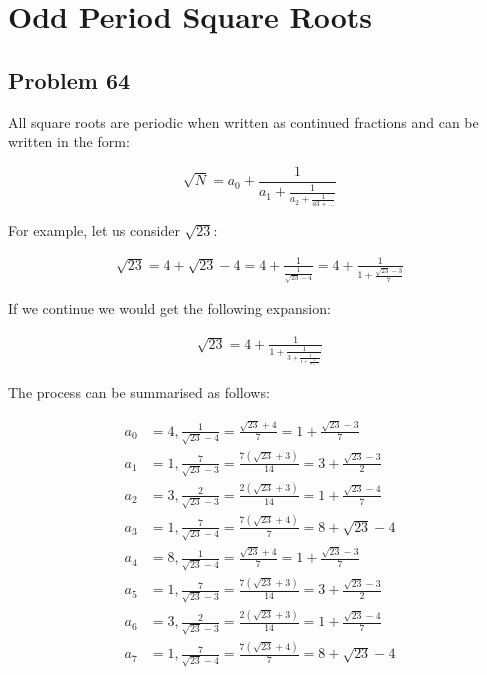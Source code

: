 \chapter{Odd Period Square Roots}
\section{Problem 64}

All square roots are periodic when written as continued fractions and can be written in the form:

\[
	\sqrt{N} = a_0 + \frac{1}{a_1 + \frac{1}{a_2 + \frac{1}{a3 + \dots}}}
\]


For example, let us consider $\sqrt{23}$:

\begin{align*}
	\sqrt{23} = 4 + \sqrt{23} - 4 = 4 + \frac{1}{\frac{1}{\sqrt{23}-4}} = 4 + \frac{1}{1 + \frac{\sqrt{23} - 3}{7}}
\end{align*}

If we continue we would get the following expansion:

\begin{align*}
	\sqrt{23} = 4 + \frac{1}{1 + \frac{1}{3 + \frac{1}{1 + \frac{1}{8 + \dots}}}}
\end{align*}

The process can be summarised as follows:

\begin{align*}
	a_0 & = 4, \frac{1}{\sqrt{23} - 4}  = \frac{\sqrt{23} + 4}{7}      = 1 + \frac{\sqrt{23} -3}{7} \\
	a_1 & = 1, \frac{7}{\sqrt{23} - 3}  = \frac{7(\sqrt{23} + 3)}{14}  = 3 + \frac{\sqrt{23} -3}{2} \\
	a_2 & = 3, \frac{2}{\sqrt{23} - 3}  = \frac{2(\sqrt{23} + 3)}{14}  = 1 + \frac{\sqrt{23} -4}{7} \\
	a_3 & = 1, \frac{7}{\sqrt{23} - 4}  = \frac{7(\sqrt{23} + 4)}{7}   = 8 + {\sqrt{23} -4}         \\
	a_4 & = 8, \frac{1}{\sqrt{23} - 4}  = \frac{\sqrt{23} + 4}{7}      = 1 + \frac{\sqrt{23} -3}{7} \\
	a_5 & = 1, \frac{7}{\sqrt{23} - 3}  = \frac{7(\sqrt{23} + 3)}{14}  = 3 + \frac{\sqrt{23} -3}{2} \\
	a_6 & = 3, \frac{2}{\sqrt{23} - 3}  = \frac{2(\sqrt{23} + 3)}{14}  = 1 + \frac{\sqrt{23} -4}{7} \\
	a_7 & = 1, \frac{7}{\sqrt{23} - 4}  = \frac{7(\sqrt{23} + 4)}{7}   = 8 + {\sqrt{23} -4}         \\
\end{align*}

